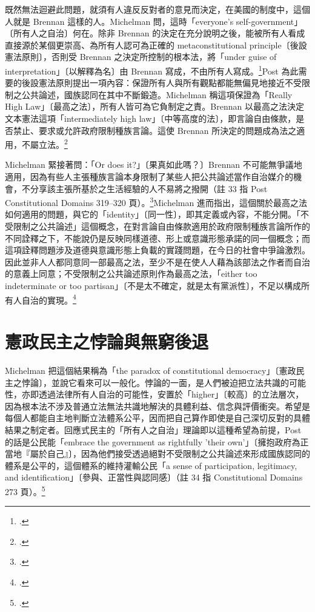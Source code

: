 既然無法迴避此問題，就須有人違反反對者的意見而決定，在美國的制度中，這個人就是 Brennan 這樣的人。Michelman 問，這時「everyone's self-government」〔所有人之自治〕何在。除非 Brennan 的決定在充分說明之後，能被所有人看成直接源於某個更崇高、為所有人認可為正確的 metaconstitutional principle〔後設憲法原則〕，否則受 Brennan 之決定所控制的根本法，將「under guise of interpretation」〔以解釋為名〕由 Brennan 寫成，不由所有人寫成。\footcite[408]{michelman1998}Post 為此需要的後設憲法原則提出一項內容：保證所有人與所有觀點都能無偏見地接近不受限制之公共論述，國族認同在其中不斷鍛造。Michelman 稱這項保證為「Really High Law」〔最高之法〕，所有人皆可為它負制定之責。Brennan 以最高之法決定文本憲法這項「intermediately high law」〔中等高度的法〕，即言論自由條款，是否禁止、要求或允許政府限制種族言論。這使 Brennan 所決定的問題成為法之適用，不屬立法。\footcite[408]{michelman1998}

Michelman 緊接著問：「Or does it?」〔果真如此嗎？〕Brennan 不可能無爭議地適用，因為有些人主張種族言論本身限制了某些人把公共論述當作自治媒介的機會，不分享該主張所基於之生活經驗的人不易將之撥開（註 33 指 Post Constitutional Domains 319--320 頁）。\footcite[408 \& n.33]{michelman1998}Michelman 進而指出，這個關於最高之法如何適用的問題，與它的「identity」〔同一性〕，即其定義或內容，不能分開。「不受限制之公共論述」這個概念，在對言論自由條款適用於政府限制種族言論所作的不同詮釋之下，不能說仍是反映同樣道德、形上或意識形態承諾的同一個概念；而這項詮釋問題涉及道德與意識形態上負載的實踐問題，在今日的社會中爭論激烈。因此並非人人都同意同一部最高之法，至少不是在使人人藉為該部法之作者而自治的意義上同意；不受限制之公共論述原則作為最高之法，「either too indeterminate or too partisan」〔不是太不確定，就是太有黨派性〕，不足以構成所有人自治的實現。\footcite[409]{michelman1998}

\section{憲政民主之悖論與無窮後退}
\label{sec:20_responsive-7}

Michelman 把這個結果稱為「the paradox of constitutional democracy」〔憲政民主之悖論〕，並說它看來可以一般化。悖論的一面，是人們被迫把立法共識的可能性，亦即透過法律所有人自治的可能性，安置於「higher」〔較高〕的立法層次，因為根本法不涉及普通立法無法共識地解決的具體利益、信念與評價衝突。希望是每個人都能自主地判斷立法體系公平，因而把自己算作即使是自己深切反對的具體結果之制定者。回應式民主的「所有人之自治」理論即以這種希望為前提，Post 的話是公民能「embrace the government as rightfully 'their own'」〔擁抱政府為正當地『屬於自己』〕，因為他們接受透過絕對不受限制之公共論述來形成國族認同的體系是公平的，這個體系的維持灌輸公民「a sense of participation, legitimacy, and identification」〔參與、正當性與認同感〕（註 34 指 Constitutional Domains 273 頁）。\footcite[409 \& n.34]{michelman1998}


